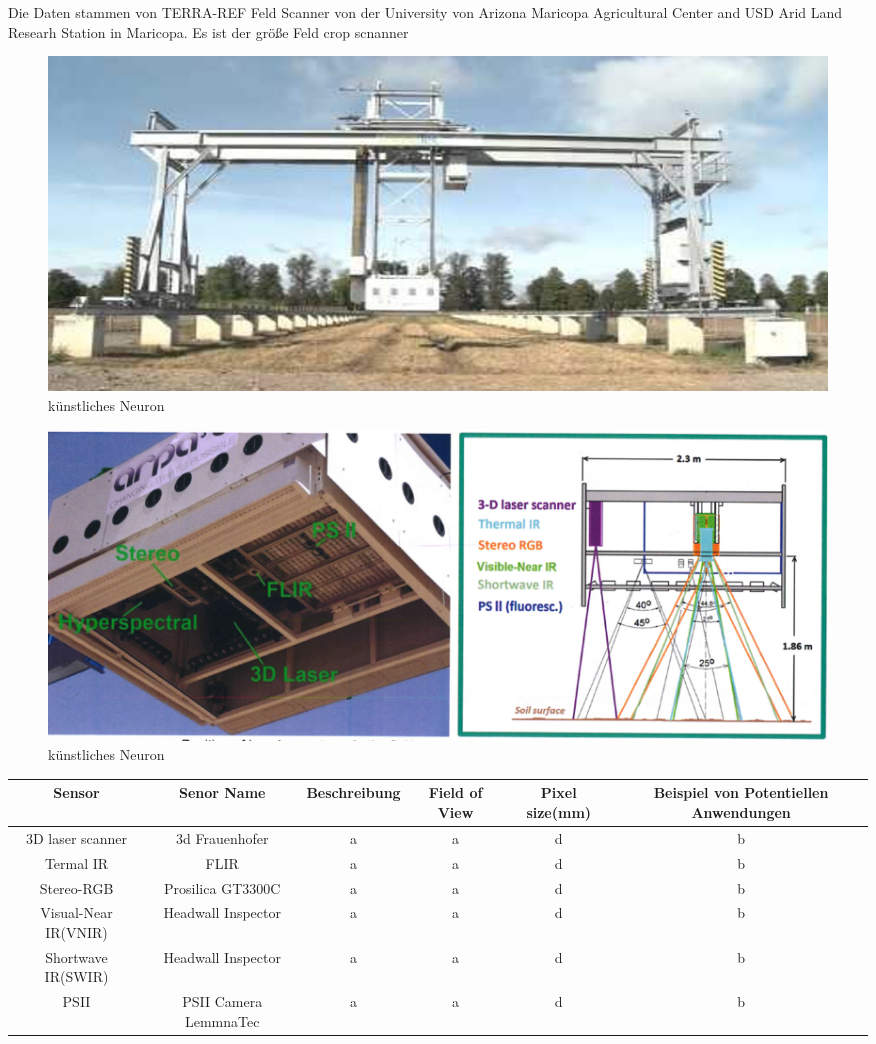 \documentclass{llncs}
\begin{document}
Die Daten stammen von TERRA-REF Feld Scanner von der University von Arizona Maricopa Agricultural Center and USD Arid Land Researh Station in Maricopa. Es ist der größe Feld crop scnanner 
\begin{figure}[htbp] 
	\centering
	\includegraphics[width=1.0\textwidth]{lematech_1.png}
	\caption{künstliches Neuron}
	\label{fig:Bild1}
\end{figure}
\begin{figure}[htbp] 
	\centering
	\includegraphics[width=1.0\textwidth]{lematech_2.png}
	\caption{künstliches Neuron}
	\label{fig:Bild1}
\end{figure}

\begin{tabular}{|c|c|c|c|c|c|}\hline
	Sensor & Senor Name & Beschreibung & Field of View & Pixel size(mm) & Beispiel von Potentiellen Anwendungen \\ \hline
	3D laser scanner & 3d Frauenhofer & a&a&d&b \\ \hline
	Termal IR & FLIR & a&a&d&b \\ \hline
	Stereo-RGB & Prosilica GT3300C & a&a&d&b\\ \hline
	Visual-Near IR(VNIR) & Headwall  Inspector & a&a&d&b\\ \hline
	Shortwave IR(SWIR) & Headwall Inspector & a&a&d&b\\ \hline
	PSII & PSII Camera LemmnaTec & a&a&d&b\\ \hline
\end{tabular}
\end{document}
